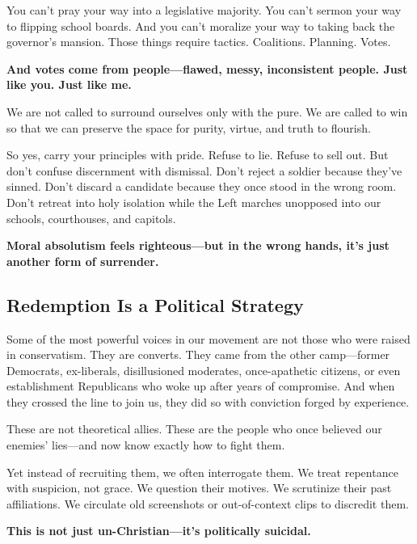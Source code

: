 You can’t pray your way into a legislative majority. You can’t sermon your way to flipping school boards. And you can’t moralize your way to taking back the governor’s mansion. Those things require tactics. Coalitions. Planning. Votes.

\textbf{And votes come from people—flawed, messy, inconsistent people. Just like you. Just like me.}

We are not called to surround ourselves only with the pure. We are called to win so that we can preserve the space for purity, virtue, and truth to flourish.

So yes, carry your principles with pride. Refuse to lie. Refuse to sell out. But don’t confuse discernment with dismissal. Don’t reject a soldier because they’ve sinned. Don’t discard a candidate because they once stood in the wrong room. Don’t retreat into holy isolation while the Left marches unopposed into our schools, courthouses, and capitols.

\textbf{Moral absolutism feels righteous—but in the wrong hands, it’s just another form of surrender.}











\subsection*{Redemption Is a Political Strategy}

Some of the most powerful voices in our movement are not those who were raised in conservatism. They are converts. They came from the other camp—former Democrats, ex-liberals, disillusioned moderates, once-apathetic citizens, or even establishment Republicans who woke up after years of compromise. And when they crossed the line to join us, they did so with conviction forged by experience.

These are not theoretical allies. These are the people who once believed our enemies’ lies—and now know exactly how to fight them.

Yet instead of recruiting them, we often interrogate them. We treat repentance with suspicion, not grace. We question their motives. We scrutinize their past affiliations. We circulate old screenshots or out-of-context clips to discredit them.

\textbf{This is not just un-Christian—it’s politically suicidal.}


